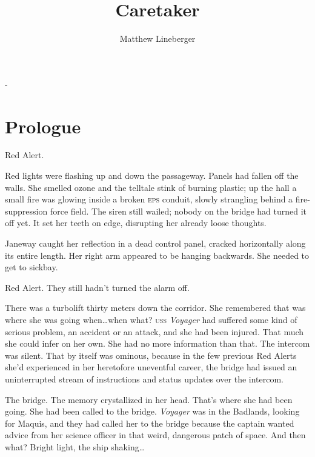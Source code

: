 \documentclass[twoside,letterpaper,12pt]{memoir}
\title{Caretaker}
\author{Matthew Lineberger}
\date
\begin{document}
\setmainfont[Ligatures=TeX, Numbers=Lowercase]{Garamond Premier Pro}

\begin{titlingpage}
	\calccentering{\unitlength}
	\begin{adjustwidth*}{\unitlength}{-\unitlength}
	\maketitle 
	\end{adjustwidth*}
\end{titlingpage}

\pagestyle{simple}

\chapter*{Prologue}

\noindent Red Alert.

Red lights were flashing up and down the passageway. Panels had fallen off the walls. She smelled ozone and the telltale stink of burning plastic; up the hall a small fire was glowing inside a broken \textsc{eps} conduit, slowly strangling behind a fire-suppression force field. The siren still wailed; nobody on the bridge had turned it off yet. It set her teeth on edge, disrupting her already loose thoughts.

Janeway caught her reflection in a dead control panel, cracked horizontally along its entire length. Her right arm appeared to be hanging backwards. She needed to get to sickbay.

Red Alert. They still hadn't turned the alarm off.

There was a turbolift thirty meters down the corridor. She remembered that was where she was going when\ldots when what? \textsc{uss} \textit{Voyager} had suffered some kind of serious problem, an accident or an attack, and she had been injured. That much she could infer on her own. She had no more information than that. The intercom was silent. That by itself was ominous, because in the few previous Red Alerts she'd experienced in her heretofore uneventful career, the bridge had issued an uninterrupted stream of instructions and status updates over the intercom.

The bridge. The memory crystallized in her head. That's where she had been going. She had been called to the bridge. \textit{Voyager} was in the Badlands, looking for Maquis, and they had called her to the bridge because the captain wanted advice from her science officer in that weird, dangerous patch of space. And then what? Bright light, the ship shaking…
\end{document}
